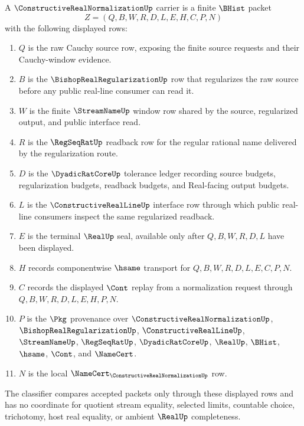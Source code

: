 \begin{definition}
\label{def:constructive-real-normalization-carrier}
A $\ConstructiveRealNormalizationUp$ carrier is a finite $\BHist$ packet
$$
Z=(Q,B,W,R,D,L,E,H,C,P,N)
$$
with the following displayed rows:
\begin{enumerate}
\item $Q$ is the raw Cauchy source row, exposing the finite source requests and their Cauchy-window evidence.
\item $B$ is the $\BishopRealRegularizationUp$ row that regularizes the raw source before any public real-line consumer can read it.
\item $W$ is the finite $\StreamNameUp$ window row shared by the source, regularized output, and public interface read.
\item $R$ is the $\RegSeqRatUp$ readback row for the regular rational name delivered by the regularization route.
\item $D$ is the $\DyadicRatCoreUp$ tolerance ledger recording source budgets, regularization budgets, readback budgets, and Real-facing output budgets.
\item $L$ is the $\ConstructiveRealLineUp$ interface row through which public real-line consumers inspect the same regularized readback.
\item $E$ is the terminal $\RealUp$ seal, available only after $Q,B,W,R,D,L$ have been displayed.
\item $H$ records componentwise $\hsame$ transport for $Q,B,W,R,D,L,E,C,P,N$.
\item $C$ records the displayed $\Cont$ replay from a normalization request through $Q,B,W,R,D,L,E,H,P,N$.
\item $P$ is the $\Pkg$ provenance over $\ConstructiveRealNormalizationUp$, $\BishopRealRegularizationUp$, $\ConstructiveRealLineUp$, $\StreamNameUp$, $\RegSeqRatUp$, $\DyadicRatCoreUp$, $\RealUp$, $\BHist$, $\hsame$, $\Cont$, and $\NameCert$.
\item $N$ is the local $\NameCert_{\ConstructiveRealNormalizationUp}$ row.
\end{enumerate}
The classifier compares accepted packets only through these displayed rows and has no coordinate for quotient stream equality, selected limits, countable choice, trichotomy, host real equality, or ambient $\RealUp$ completeness.
\end{definition}

